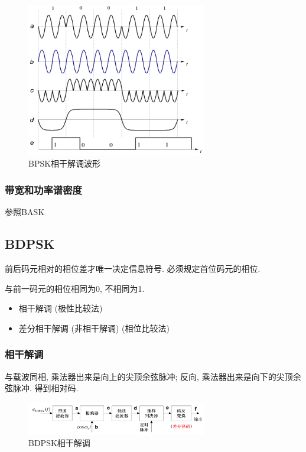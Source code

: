 \documentclass[a4paper]{report}
\begin{document}
\begin{figure}[H]
\centering
\includegraphics[width=0.7\textwidth]{bpsk_co_wave.png}
\caption{BPSK相干解调波形}
\end{figure}

\subsubsection{带宽和功率谱密度}
参照BASK
\subsection{BDPSK}
前后码元相对的相位差才唯一决定信息符号. 必须规定首位码元的相位. 

与前一码元的相位相同为0, 不相同为1. 
\begin{itemize}
  \item 相干解调 (极性比较法)
  \item 差分相干解调 (非相干解调) (相位比较法)
\end{itemize}
\subsubsection{相干解调}
与载波同相, 乘法器出来是向上的尖顶余弦脉冲; 反向, 乘法器出来是向下的尖顶余弦脉冲. 得到相对码. 

\begin{figure}[H]
\centering
\includegraphics[width=0.7\textwidth]{bdpsk_co.png}
\caption{BDPSK相干解调}
\end{figure}
\end{document}
